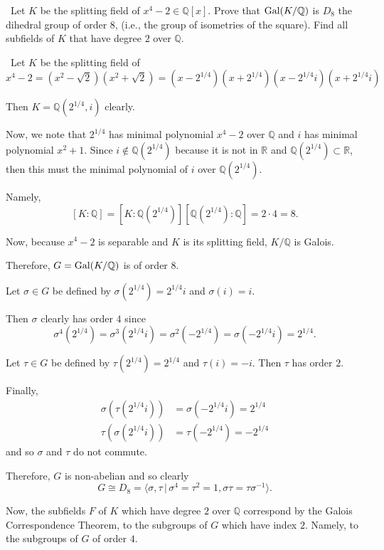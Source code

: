 \documentclass[12pt]{AlgebraQual}
\begin{document}
\begin{problem} $\,$
Let $K$ be the splitting field of $x^4-2\in\mathbb{Q}[x]$. Prove that $\text{Gal}(K/\mathbb{Q})$ is $D_8$ the dihedral group of order $8$, (i.e., the group of isometries of the square). Find all subfields of $K$ that have degree $2$ over $\mathbb{Q}$.
\end{problem}


\begin{solution}$\,$
Let $K$ be the splitting field of $$x^4-2=(x^2-\sqrt{2})(x^2+\sqrt{2})=(x-2^{1/4})(x+2^{1/4})(x-2^{1/4}i)(x+2^{1/4}i)$$

Then $K=\mathbb{Q}(2^{1/4},i)$ clearly.

Now, we note that $2^{1/4}$ has minimal polynomial $x^4-2$ over $\mathbb{Q}$ and $i$ has minimal polynomial $x^2+1$. Since $i\notin\mathbb{Q}(2^{1/4})$ because it is not in $\mathbb{R}$ and $\mathbb{Q}(2^{1/4})\subset\mathbb{R}$, then this must the minimal polynomial of $i$ over $\mathbb{Q}(2^{1/4})$.

Namely, $$[K:\mathbb{Q}]=[K:\mathbb{Q}(2^{1/4})][\mathbb{Q}(2^{1/4}):\mathbb{Q}]=2\cdot 4=8.$$

Now, because $x^4-2$ is separable and $K$ is its splitting field, $K/\mathbb{Q}$ is Galois.

Therefore, $G=\text{Gal}(K/\mathbb{Q})$ is of order $8$.

Let $\sigma\in G$ be defined by $\sigma(2^{1/4})=2^{1/4}i$ and $\sigma(i)=i$.

Then $\sigma$ clearly has order $4$ since $$\sigma^4(2^{1/4})=\sigma^3(2^{1/4}i)=\sigma^2(-2^{1/4})=\sigma(-2^{1/4}i)=2^{1/4}.$$

Let $\tau\in G$ be defined by $\tau(2^{1/4})=2^{1/4}$ and $\tau(i)=-i$. Then $\tau$ has order $2$.

Finally, \begin{align*}
    \sigma(\tau(2^{1/4}i))&=\sigma(-2^{1/4}i)=2^{1/4}\\
    \tau(\sigma(2^{1/4}i))&=\tau(-2^{1/4})=-2^{1/4}
\end{align*} and so $\sigma$ and $\tau$ do not commute.

Therefore, $G$ is non-abelian and so clearly $$G\cong D_8=\langle\sigma,\tau\,|\,\sigma^4=\tau^2=1,\sigma\tau=\tau\sigma^{-1}\rangle.$$

Now, the subfields $F$ of $K$ which have degree $2$ over $\mathbb{Q}$ correspond by the Galois Correspondence Theorem, to the subgroups of $G$ which have index $2$. Namely, to the subgroups of $G$ of order $4$.


\end{solution}
\end{document}
